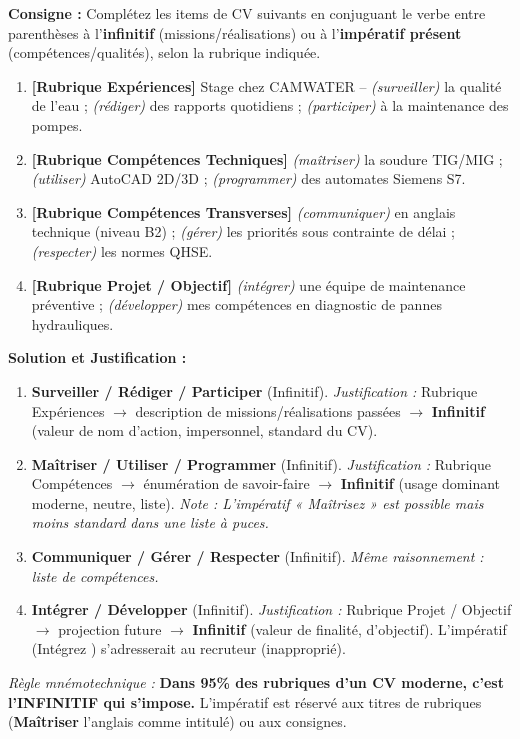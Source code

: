 \documentclass[11pt]{article}
\begin{document}
\begin{exoresolu}
\textbf{Consigne :} Complétez les items de CV suivants en conjuguant le verbe entre parenthèses à l'\textbf{infinitif} (missions/réalisations) ou à l'\textbf{impératif présent} (compétences/qualités), selon la rubrique indiquée.
\begin{enumerate}
    \item \textbf{[Rubrique Expériences]} Stage chez CAMWATER -- \textit{(surveiller)} la qualité de l'eau ; \textit{(rédiger)} des rapports quotidiens ; \textit{(participer)} à la maintenance des pompes.
    \item \textbf{[Rubrique Compétences Techniques]} \textit{(maîtriser)} la soudure TIG/MIG ; \textit{(utiliser)} AutoCAD 2D/3D ; \textit{(programmer)} des automates Siemens S7.
    \item \textbf{[Rubrique Compétences Transverses]} \textit{(communiquer)} en anglais technique (niveau B2) ; \textit{(gérer)} les priorités sous contrainte de délai ; \textit{(respecter)} les normes QHSE.
    \item \textbf{[Rubrique Projet / Objectif]} \textit{(intégrer)} une équipe de maintenance préventive ; \textit{(développer)} mes compétences en diagnostic de pannes hydrauliques.
\end{enumerate}
\tcblower
\textbf{Solution et Justification :}
\begin{enumerate}
    \item \textbf{Surveiller / Rédiger / Participer} (Infinitif). \emph{Justification :} Rubrique \guillemotleft Expériences \guillemotright $\rightarrow$ description de missions/réalisations passées $\rightarrow$ \textbf{Infinitif} (valeur de nom d'action, impersonnel, standard du CV).
    \item \textbf{Maîtriser / Utiliser / Programmer} (Infinitif). \emph{Justification :} Rubrique \guillemotleft Compétences \guillemotright $\rightarrow$ énumération de savoir-faire $\rightarrow$ \textbf{Infinitif} (usage dominant moderne, neutre, liste). \textit{Note : L'impératif « Maîtrisez » est possible mais moins standard dans une liste à puces.}
    \item \textbf{Communiquer / Gérer / Respecter} (Infinitif). \emph{Même raisonnement : liste de compétences.}
    \item \textbf{Intégrer / Développer} (Infinitif). \emph{Justification :} Rubrique \guillemotleft Projet / Objectif \guillemotright $\rightarrow$ projection future $\rightarrow$ \textbf{Infinitif} (valeur de finalité, d'objectif). L'impératif (\guillemotleft Intégrez \guillemotright) s'adresserait au recruteur (inapproprié).
\end{enumerate}
\emph{Règle mnémotechnique :} \textbf{Dans 95\% des rubriques d'un CV moderne, c'est l'INFINITIF qui s'impose.} L'impératif est réservé aux titres de rubriques (\guillemotleft \textbf{Maîtriser} l'anglais \guillemotright comme intitulé) ou aux consignes.
\end{exoresolu}
\end{document}
